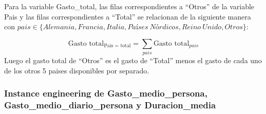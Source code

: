 \documentclass[data,article,submit,moreauthors,pdftex]{Definitions/mdpi}
\newenvironment{Shaded}{\begin{snugshade}}{\end{snugshade}}
\newcommand{\ControlFlowTok}[1]{\textcolor[rgb]{0.13,0.29,0.53}{\textbf{#1}}}
\newcommand{\DecValTok}[1]{\textcolor[rgb]{0.00,0.00,0.81}{#1}}
\newcommand{\FunctionTok}[1]{\textcolor[rgb]{0.13,0.29,0.53}{\textbf{#1}}}
\newcommand{\NormalTok}[1]{#1}
\newcommand{\OtherTok}[1]{\textcolor[rgb]{0.56,0.35,0.01}{#1}}
\newcommand{\SpecialCharTok}[1]{\textcolor[rgb]{0.81,0.36,0.00}{\textbf{#1}}}
\newcommand{\StringTok}[1]{\textcolor[rgb]{0.31,0.60,0.02}{#1}}
\begin{document}
Para la variable Gasto\_total, las filas correspondientes a ``Otros'' de
la variable Pais y las filas correspondientes a ``Total'' se relacionan
de la siguiente manera con
\(pais\in\{Alemania, Francia,Italia, Países\ Nórdicos, Reino\ Unido, Otros\}\):

\[ \text{Gasto total}_{\text{Pais = total}} = \sum_{pais}{\text{Gasto total}_{pais}}\]
Luego el gasto total de ``Otros'' es el gasto de ``Total'' menos el
gasto de cada uno de los otros 5 paises disponibles por separado.

\begin{Shaded}
\end{Shaded}

\hypertarget{instance-engineering-de-gasto_medio_persona-gasto_medio_diario_persona-y-duracion_media}{%
\subsubsection{Instance engineering de Gasto\_medio\_persona,
Gasto\_medio\_diario\_persona y
Duracion\_media}\label{instance-engineering-de-gasto_medio_persona-gasto_medio_diario_persona-y-duracion_media}}
\end{document}
